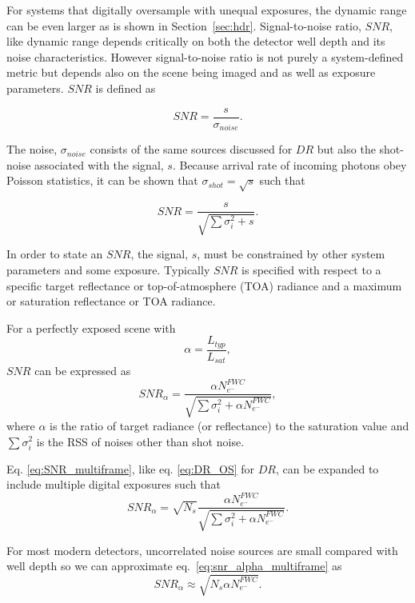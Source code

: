 \documentclass[]{spieman}  %
\begin{document}
For systems that digitally oversample with unequal exposures, the dynamic range can be even larger as is shown in Section~\ref{sec:hdr}.
Signal-to-noise ratio, $SNR$, like dynamic range depends critically on both the detector well depth and its noise characteristics.  However signal-to-noise ratio is not purely a system-defined metric but depends also on the scene being imaged and as well as exposure parameters.  $SNR$ is defined as

\begin{equation*}
    SNR = \frac{s}{\sigma_{noise}}.
\end{equation*}

The noise, $\sigma_{noise}$ consists of the same sources discussed for $DR$ but also the shot-noise associated with the signal, $s$.  Because arrival rate of incoming photons obey Poisson statistics, it can be shown that $\sigma_{shot} = \sqrt{s}$ such that

\begin{equation*}
    SNR = \frac{s}{\sqrt{\sum{\sigma_i^2} + s}}.
\end{equation*}

In order to state an $SNR$, the signal, $s$, must be constrained by other system parameters and some exposure.  Typically $SNR$ is specified with respect to a specific target reflectance or top-of-atmosphere (TOA) radiance and a maximum or saturation reflectance or TOA radiance.  

For a perfectly exposed scene with
\begin{equation}
    \alpha = \frac{L_{typ}}{L_{sat}},
\end{equation}
${SNR}$ can be expressed as
\begin{equation}
    SNR_{\alpha} = \frac{\alpha N_{e^-}^{FWC}}{\sqrt{\sum{\sigma_i^2} + \alpha N_{e^-}^{FWC}}},
\label{eq:SNR_multiframe}
\end{equation}
where $\alpha$ is the ratio of target radiance (or reflectance) to the saturation value and $\sum{\sigma_i^2}$ is the RSS of noises other than shot noise.

Eq. \eqref{eq:SNR_multiframe}, like eq. \eqref{eq:DR_OS} for $DR$, can be expanded to include multiple digital exposures such that
\begin{equation}
\label{eq:snr_alpha_multiframe}
SNR_{\alpha} = \sqrt{N_s}\frac{\alpha N_{e^-}^{FWC}}{\sqrt{\sum{\sigma_i^2} + \alpha N_{e^-}^{FWC}}}.
\end{equation}

For most modern detectors, uncorrelated noise sources are small compared with well depth so we can approximate eq.~\eqref{eq:snr_alpha_multiframe} as
\begin{equation}
\label{eq:snr_alpha_multiframe_simp}
SNR_{\alpha} \approx \sqrt{N_s \alpha N_{e^-}^{FWC}}.
\end{equation}
\end{document}
